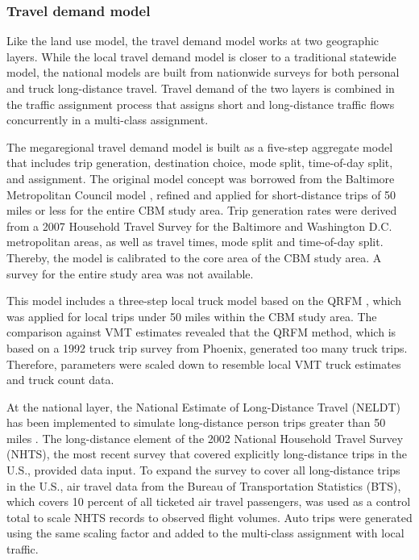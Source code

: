 \subsubsection{Travel demand model}

Like the land use model, the travel demand model works at two geographic layers. While the local travel demand model is closer to a traditional statewide model, the national models are built from nationwide surveys for both personal and truck long-distance travel. Travel demand of the two layers is combined in the traffic assignment process that assigns short and long-distance traffic flows concurrently in a multi-class assignment.

The megaregional travel demand model is built as a five-step aggregate model that includes trip generation, destination choice, mode split, time-of-day split, and assignment. The original model concept was borrowed from the Baltimore Metropolitan Council model \citep{bmc07}, refined and applied for short-distance trips of 50 miles or less for the entire CBM study area. Trip generation rates were derived from a 2007 Household Travel Survey for the Baltimore and Washington D.C. metropolitan areas, as well as travel times, mode split and time-of-day split. Thereby, the model is calibrated to the core area of the CBM study area. A survey for the entire study area was not available.

This model includes a three-step local truck model based on the QRFM \citep{beagan07}, which was applied for local trips under 50 miles within the CBM study area. The comparison against VMT estimates revealed that the QRFM method, which is based on a 1992 truck trip survey from Phoenix, generated too many truck trips. Therefore, parameters were scaled down to resemble local VMT truck estimates and truck count data.

At the national layer, the National Estimate of Long-Distance Travel (NELDT) has been implemented to simulate long-distance person trips greater than 50 miles \citep{moeckel11}. The long-distance element of the 2002 National Household Travel Survey (NHTS), the most recent survey that covered explicitly long-distance trips in the U.S., provided data input. To expand the survey to cover all long-distance trips in the U.S., air travel data from the Bureau of Transportation Statistics (BTS), which covers 10 percent of all ticketed air travel passengers, was used as a control total to scale NHTS records to observed flight volumes. Auto trips were generated using the same scaling factor and added to the multi-class assignment with local traffic.

